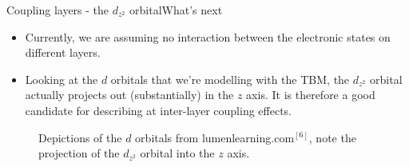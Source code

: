 \documentclass[9pt]{beamer}
\begin{document}
\begin{frame}{Coupling layers - the $d_{z^2}$ orbital}{What's next}
  \begin{itemize}
    \item Currently, we are assuming no interaction between the electronic states on different layers.

    \item Looking at the $d$ orbitals that we're modelling with the TBM, the $d_{z^2}$ orbital actually projects out (substantially) in the $z$ axis. It is therefore a good candidate for describing at inter-layer coupling effects.
  \end{itemize}

  \begin{figure}
    \centering
    \caption{Depictions of the $d$ orbitals from lumenlearning.com$^{[6]}$, note the projection of the $d_{z^2}$ orbital into the $z$ axis.}
  \end{figure}
\end{frame}
\end{document}
